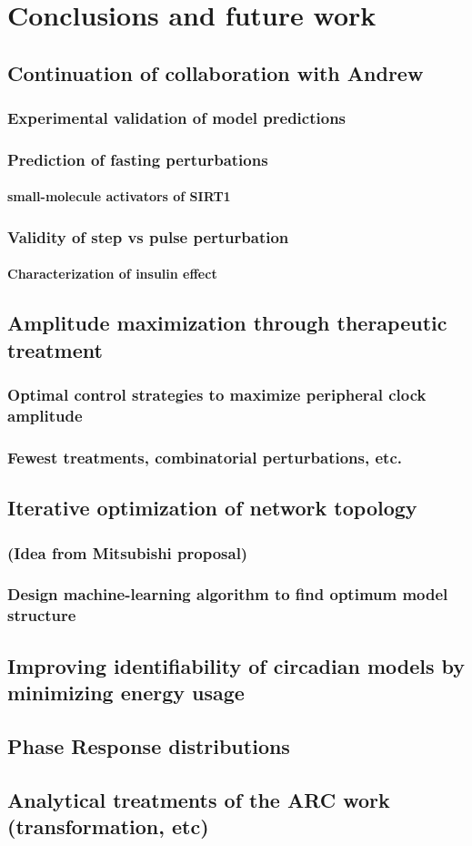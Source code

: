\chapter{Conclusions and future work}
\section{Continuation of collaboration with Andrew}\blindtext
\subsection{Experimental validation of model predictions}\blindtext
\subsection{Prediction of fasting perturbations}\blindtext
\subsubsection{small-molecule activators of SIRT1}\blindtext
\subsection{Validity of step vs pulse perturbation}\blindtext
\subsubsection{Characterization of insulin effect}\blindtext
\section{Amplitude maximization through therapeutic treatment}\blindtext
\subsection{Optimal control strategies to maximize peripheral clock amplitude}\blindtext
\subsection{Fewest treatments, combinatorial perturbations, etc.}\blindtext
\section{Iterative optimization of network topology}\blindtext
\subsection{(Idea from Mitsubishi proposal)}\blindtext
\subsection{Design machine-learning algorithm to find optimum model structure}\blindtext
\section{Improving identifiability of circadian models by minimizing energy usage}
\section{Phase Response distributions}
\section{Analytical treatments of the ARC work (transformation, etc)}

